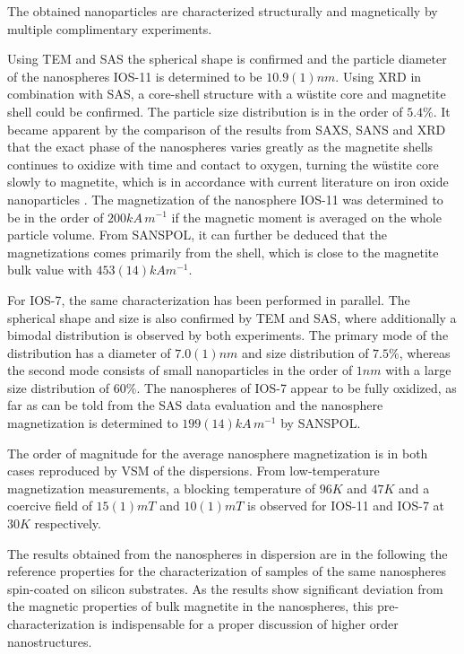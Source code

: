 \documentclass[\main/dresen_thesis.tex]{subfiles}
\begin{document}
  \label{sec:looselyPackedNS:nanoparticle:discussion:summary}
  The obtained nanoparticles are characterized structurally and magnetically by multiple complimentary experiments.

  Using TEM and SAS the spherical shape is confirmed and the particle diameter of the nanospheres IOS-11 is determined to be $10.9(1) \unit{nm}$.
  Using XRD in combination with SAS, a core-shell structure with a w\"ustite core and magnetite shell could be confirmed.
  The particle size distribution is in the order of $5.4 \unit{\%}$.
  It became apparent by the comparison of the results from SAXS, SANS and XRD that the exact phase of the nanospheres varies greatly as the magnetite shells continues to oxidize with time and contact to oxygen, turning the w\"ustite core slowly to magnetite, which is in accordance with current literature on iron oxide nanoparticles .
  The magnetization of the nanosphere IOS-11 was determined to be in the order of $200 \unit{kA \, m^{-1}}$ if the magnetic moment is averaged on the whole particle volume.
  From SANSPOL, it can further be deduced that the magnetizations comes primarily from the shell, which is close to the magnetite bulk value with $453(14) \unit{kA m^{-1}}$.

  For IOS-7, the same characterization has been performed in parallel.
  The spherical shape and size is also confirmed by TEM and SAS, where additionally a bimodal distribution is observed by both experiments.
  The primary mode of the distribution has a diameter of $7.0(1) \unit{nm}$ and size distribution of $7.5 \unit{\%}$, whereas the second mode consists of small nanoparticles in the order of $1 \unit{nm}$ with a large size distribution of $60 \%$.
  The nanospheres of IOS-7 appear to be fully oxidized, as far as can be told from the SAS data evaluation and the nanosphere magnetization is determined to $199(14) \unit{kA \, m^{-1}}$ by SANSPOL.

  The order of magnitude for the average nanosphere magnetization is in both cases reproduced by VSM of the dispersions.
  From low-temperature magnetization measurements, a blocking temperature of $96 \unit{K}$ and $47 \unit{K}$ and a coercive field of $15(1) \unit{mT}$ and $10(1) \unit{mT}$ is observed for IOS-11 and IOS-7 at $30 \unit{K}$ respectively.

  The results obtained from the nanospheres in dispersion are in the following the reference properties for the characterization of samples of the same nanospheres spin-coated on silicon substrates.
  As the results show significant deviation from the magnetic properties of bulk magnetite in the nanospheres, this pre-characterization is indispensable for a proper discussion of higher order nanostructures.
\end{document}
